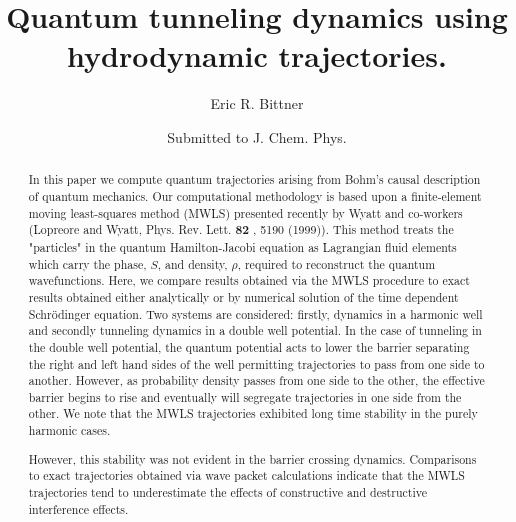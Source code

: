
\newcommand{\NFIGure}[1]{\psfig{figure#1,height5.5in}}
\newcommand{\SFIGure}[1]{\psfig{figure=#1,width=6in}}
\newcommand{\FIGure}[1]{\psfig{figure=#1,width=6in}}
\newcommand{\mathGraphic}[1]{\psfig{figure=#1,width=6in}}
\newcommand{\xxx}{Hello}
\def\btt#1{{\tt$\backslash$#1}}

\def\cmm{{\rm cm}^{-1}}

 
 
\title{Quantum tunneling dynamics using hydrodynamic trajectories. }
\author{Eric R. Bittner}
\address{Department of Chemistry, University of Houston, Houston, TX 77204}
\date{Submitted to  J. Chem. Phys.}
\maketitle
 \begin{abstract}
 In this paper we compute quantum trajectories arising from Bohm's 
 causal description of quantum mechanics.  Our computational 
 methodology is based upon a finite-element moving least-squares 
 method (MWLS) presented recently by Wyatt and co-workers (Lopreore 
 and Wyatt, Phys.  Rev.  Lett.  {\bf 82} , 5190 (1999)).  This method 
 treats the "particles" in the quantum Hamilton-Jacobi equation as 
 Lagrangian fluid elements which carry the phase, $S$, and density, 
 $\rho$, required to reconstruct the quantum wavefunctions.  Here, we 
 compare results obtained via the MWLS procedure to exact results 
 obtained either analytically or by numerical solution of the time 
 dependent Schr\"odinger equation.  Two systems are considered: 
 firstly, dynamics in a harmonic well and secondly tunneling dynamics 
 in a double well potential.  In the case of tunneling in the double 
 well potential, the quantum potential acts to lower the barrier 
 separating the right and left hand sides of the well permitting 
 trajectories to pass from one side to another.  However, as 
 probability density passes from one side to the other, the effective 
 barrier begins to rise and eventually will segregate trajectories in 
 one side from the other.  We note that the MWLS trajectories 
 exhibited long time stability in the purely harmonic cases.  

 However, this stability was not evident in the barrier crossing dynamics.  
 Comparisons to exact trajectories obtained via wave packet 
 calculations indicate that the MWLS trajectories tend to 
 underestimate the effects of constructive and destructive 
 interference effects.
\end{abstract}

